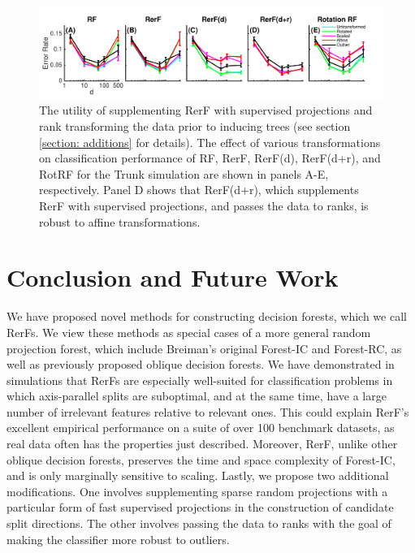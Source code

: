\documentclass{article}
\begin{document}
\begin{figure}[ht]
\vskip 0.2in
\begin{center}
\centerline{\includegraphics[width=\columnwidth]{../Figures/pdf/Fig5_robustness}}
\caption{The utility of supplementing RerF with supervised projections and rank transforming the data prior to inducing trees (see section \ref{section: additions} for details). The effect of various transformations on classification performance of RF, RerF, RerF(d), RerF(d+r), and RotRF for the Trunk simulation are shown in panels A-E, respectively. Panel D shows that RerF(d+r), which supplements RerF with supervised projections, and passes the data to ranks, is robust to affine transformations.}
\label{robustness}
\end{center}
\vskip -0.2in
\end{figure}

\section{Conclusion and Future Work}

We have proposed novel methods for constructing decision forests, which we call RerFs. We view these methods as special cases of a more general random projection forest, which include Breiman's original Forest-IC and Forest-RC, as well as previously proposed oblique decision forests. We have demonstrated in simulations that RerFs are especially well-suited for classification problems in which axis-parallel splits are suboptimal, and at the same time, have a large number of irrelevant features relative to relevant ones. This could explain RerF's excellent empirical performance on a suite of over 100 benchmark datasets, as real data often has the properties just described. Moreover, RerF, unlike other oblique decision forests, preserves the time and space complexity of Forest-IC, and is only marginally sensitive to scaling. Lastly, we propose two additional modifications. One involves supplementing sparse random projections with a particular form of fast supervised projections in the construction of candidate split directions. The other involves passing the data to ranks with the goal of making the classifier more robust to outliers.
\end{document}
